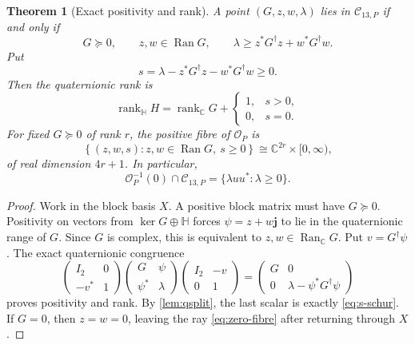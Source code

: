 \documentclass[11pt]{article}
\newtheorem{theorem}{Theorem}[section]
\theoremstyle{definition}
\theoremstyle{remark}
\newcommand{\C}{\mathbb C}
\newcommand{\Hh}{\mathbb H}
\newcommand{\rank}{\operatorname{rank}}
\newcommand{\Ran}{\operatorname{Ran}}
\newcommand{\cC}{\mathcal C}
\newcommand{\cO}{\mathcal O}
\newcommand{\bj}{\mathbf j}
\begin{document}
\begin{theorem}[Exact positivity and rank]\label{thm:positivity}
A point $(G,z,w,\lambda)$ lies in $\cC_{13,P}$ if and only if
\begin{equation}\label{eq:positivity}
 \boxed{
 G\succeq0,
 \qquad z,w\in\Ran G,
 \qquad
 \lambda\ge z^*G^\dagger z+w^*G^\dagger w.}
\end{equation}
Put
\begin{equation}\label{eq:s-schur}
 s=\lambda-z^*G^\dagger z-w^*G^\dagger w\ge0.
\end{equation}
Then the quaternionic rank is
\begin{equation}\label{eq:rank}
 \boxed{
 \rank_{\Hh}H
 =\rank_{\C}G+
 \begin{cases}1,&s>0,\\0,&s=0.\end{cases}}
\end{equation}
For fixed $G\succeq0$ of rank $r$, the positive fibre of $\cO_P$ is
\begin{equation}\label{eq:fibre}
 \left\{
 (z,w,s):z,w\in\Ran G,\ s\ge0
 \right\}
 \cong\C^{2r}\times[0,\infty),
\end{equation}
of real dimension $4r+1$.  In particular,
\begin{equation}\label{eq:zero-fibre}
 \boxed{
 \cO_P^{-1}(0)\cap\cC_{13,P}
 =\{\lambda uu^*: \lambda\ge0\}.}
\end{equation}
\end{theorem}

\begin{proof}
Work in the block basis $X$.  A positive block matrix must have $G\succeq0$.  Positivity on vectors from $\ker G\oplus\Hh$ forces $\psi=z+w\bj$ to lie in the quaternionic range of $G$.  Since $G$ is complex, this is equivalent to $z,w\in\Ran_{\C}G$.  Put $v=G^\dagger\psi$.  The exact quaternionic congruence
\[
 \begin{pmatrix}I_2&0\\-v^*&1\end{pmatrix}
 \begin{pmatrix}G&\psi\\\psi^*&\lambda\end{pmatrix}
 \begin{pmatrix}I_2&-v\\0&1\end{pmatrix}
 =\begin{pmatrix}G&0\\0&\lambda-\psi^*G^\dagger\psi\end{pmatrix}
\]
proves positivity and rank.  By \cref{lem:qsplit}, the last scalar is exactly \eqref{eq:s-schur}.  If $G=0$, then $z=w=0$, leaving the ray \eqref{eq:zero-fibre} after returning through $X$.
\end{proof}
\end{document}
